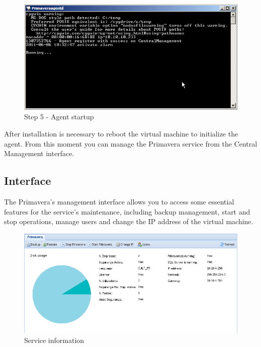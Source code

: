 \begin{figure}[H]
    \begin{center}
    \includegraphics[scale=0.6]{screenshots/primavera/primaverainstall_05.png}
    \caption{Step 5 - Agent startup}
    \label{fig:primavera_install_passo5}
    \end{center}
\end{figure}

After installation is necessary to reboot the virtual machine to initialize the agent.
From this moment you can manage the Primavera service from the Central Management interface.

\subsection{Interface}

The Primavera's management interface allows you to access some essential features for the service's maintenance, including backup management, start and stop operations, manage users and change the IP address of the virtual machine.

\begin{figure}[H]
    \begin{center}
    \includegraphics[scale=0.5]{screenshots/primavera/primavera_main.png}
    \caption{Service information}
    \label{fig:primavera_info}
    \end{center}
\end{figure}

